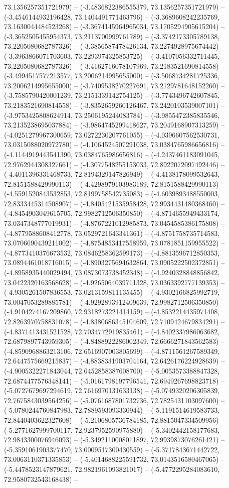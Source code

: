 73.1356257351721979) -- (-3.4836822386555379, 73.1356257351721979) -- (-3.4546144932196428, 73.1404491771463796) -- (-3.3689608242235769, 73.1630044484523268) -- (-3.3674145964965034, 73.1705294905615204) -- (-3.3652505455954373, 73.2113700999761789) -- (-3.3742173305789138, 73.2205080682787326) -- (-3.3856587478426134, 73.2274928975674442) -- (-3.3963866071703603, 73.2293974325853725) -- (-3.4107056332711445, 73.2205080682787326) -- (-3.4162716078107969, 73.2183521690814558) -- (-3.4994517577213577, 73.2006214995655000) -- (-3.5068734281725336, 73.2006214995655000) -- (-3.7409538270227691, 73.2129781648152260) -- (-3.7585790420001239, 73.2151339142754125) -- (-3.7743496742607845, 73.2183521690814558) -- (-3.8352659260126467, 73.2420103539007101) -- (-3.9753425808624914, 73.2506195244083784) -- (-3.9855472385835546, 73.2135238695037884) -- (-3.9864745299418627, 73.2049168907313259) -- (-4.0251279967300659, 73.0272230207761055) -- (-4.0396607562530731, 73.0315088020972780) -- (-4.1064524507291038, 73.0384765986656816) -- (-4.1144919443541390, 73.0384765986656816) -- (-4.2437461183091045, 72.9762944308327661) -- (-4.3077548255153033, 72.8922072097492446) -- (-4.4011396331468733, 72.8194329147826949) -- (-4.4138178099532643, 72.8151588429990113) -- (-4.4298979103983189, 72.8151588429990113) -- (-4.5591520843532853, 72.8199758542735083) -- (-4.6039893488550003, 72.8333445314508907) -- (-4.8405421535958428, 72.9934431480368460) -- (-4.8454903049615705, 72.9982712506350850) -- (-4.8714655949433174, 73.0347348777019931) -- (-4.8767221012985873, 73.0454585386175808) -- (-4.8779588608412778, 73.0529721643341361) -- (-4.8751758735714583, 73.0706690439211002) -- (-4.8754853417558959, 73.0781851159955522) -- (-4.8773410376673532, 73.0846258362599173) -- (-4.8813596712850353, 73.0894461018716015) -- (-4.8903275694632864, 73.0905222502372851) -- (-4.8958935440029494, 73.0873073738452348) -- (-4.9240328848856842, 73.0422320163568628) -- (-4.9265064039711328, 73.0363392777139353) -- (-4.9305261507836553, 73.0213159811135455) -- (-4.9302166825992719, 73.0047053289885781) -- (-4.9292893912409639, 72.9982712506350850) -- (-4.9104274167209860, 72.9318273221414159) -- (-4.8532214435971408, 72.8263970758831078) -- (-4.8380686345104609, 72.7109424679834291) -- (-4.8371413431521528, 72.7034772919835461) -- (-4.8402337986063682, 72.6879897743959305) -- (-4.8488922286002349, 72.6666271843562583) -- (-4.8590968863213106, 72.6516907003805699) -- (-4.8711561267589349, 72.6447575669215837) -- (-4.8838331903704164, 72.6426176224928639) -- (-4.9005322271843044, 72.6452858387608700) -- (-5.0053573388847328, 72.6874477576348141) -- (-5.0161798197796541, 72.6949267698823718) -- (-5.0727679697294619, 72.7616970131633138) -- (-5.0749320206305839, 72.7675843039564256) -- (-5.0761687801732736, 72.7825431103097600) -- (-5.0780244760847983, 72.7889593093330944) -- (-5.1191514619583733, 72.8440403622327608) -- (-5.2106805736784185, 72.8815047334509956) -- (-5.2771627999700117, 72.9237952590975880) -- (-5.3402442158177683, 72.9843300076946093) -- (-5.3492110008011897, 72.9939873076261421) -- (-5.3591061903377470, 73.0009517300430559) -- (-5.3717843671442722, 73.0063110371335853) -- (-5.4014688225591732, 73.0143516580467065) -- (-5.4478523147879621, 72.9821961093821017) -- (-5.4772295284083610, 72.9580732543168438) -- 